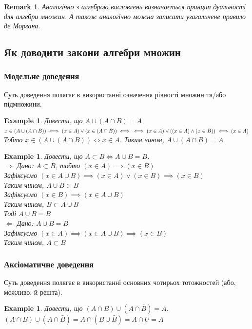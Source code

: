\documentclass[a4paper, 14pt]{extarticle}
\def\rightproof{$\boxed{\Rightarrow}$ }
\def\leftproof{$\boxed{\Leftarrow}$ }
\theoremstyle{theoremdd}
\theoremstyle{theoremdd}
\theoremstyle{theoremdd}
\theoremstyle{theoremdd}
\theoremstyle{theoremdd}
\newtheorem{example}[theorem]{Example}
\theoremstyle{theoremdd}
\theoremstyle{theoremdd}
\theoremstyle{theoremdd}
\theoremstyle{theoremdd}
\theoremstyle{theoremdd}
\theoremstyle{theoremdd}
\newtheorem{remark}[theorem]{Remark}
\theoremstyle{theoremdd}
\theoremstyle{theoremdd}
\theoremstyle{theoremdd}
\theoremstyle{theoremdd}
\begin{document}
\begin{remark}
Аналогічно з алгеброю висловлень визначається принцип дуальності для алгебри множин. А також аналогічно можна записати узагальнене правило де Моргана.
\end{remark}

\subsection{Як доводити закони алгебри множин}
\subsubsection{Модельне доведення}
Суть доведення полягає в використанні означення рівності множин та/або підмножини.
\begin{example}
Довести, що $A \cup (A \cap B) = A$.\\
$x \in (A \cup (A \cap B)) \iff (x \in A) \vee (x \in (A \cap B)) \iff  \\ \iff (x \in A) \vee ((x \in A) \wedge (x \in B)) \iff (x \in A)$\\
Тобто $x \in (A \cup (A \cap B)) \iff x \in A$. Таким чином, $A \cup (A \cap B) = A$
\end{example}

\begin{example}
Довести, що $A \subset B \iff A \cup B = B$.\\
\rightproof Дано: $A \subset B$, тобто $(x \in A) \implies (x \in B)$\\
Зафіксуємо $(x \in A \cup B) \implies (x \in A) \vee (x \in B) \implies (x \in B)$\\
Таким чином, $A \cup B \subset B$\\
Зафіксуємо $(x \in B) \implies (x \in A \cup B)$\\
Таким чином, $B \subset A \cup B$\\
Тоді $A \cup B = B$
\bigskip \\
\leftproof Дано: $A \cup B = B$\\
Зафіксуємо $(x \in A) \implies (x \in A \cup B) \implies (x \in B)$\\
Таким чином, $A \subset B$
\end{example}

\subsubsection{Аксіоматичне доведення}
Суть доведення полягає в використанні основних чотирьох тотожностей (або, можливо, й решта).
\begin{example}
Довести, що $(A \cap B) \cup (A \cap \bar{B}) = A$.\\
$(A \cap B) \cup (A \cap \bar{B}) = A \cap (B \cup \bar{B}) = A \cap U = A$
\end{example}
\end{document}
